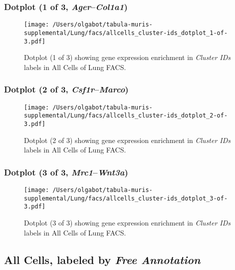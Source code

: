 \clearpage

\subsubsection{Dotplot (1 of 3, \emph{Ager}--\emph{Col1a1})}
\begin{figure}[h]
\centering
\texttt{[image: /Users/olgabot/tabula-muris-supplemental/Lung/facs/allcells\_cluster-ids\_dotplot\_1-of-3.pdf]}

\caption{ Dotplot (1 of 3)  showing gene expression enrichment in \emph{Cluster IDs} labels in All Cells of Lung FACS. }
\end{figure}


\clearpage

\subsubsection{Dotplot (2 of 3, \emph{Csf1r}--\emph{Marco})}
\begin{figure}[h]
\centering
\texttt{[image: /Users/olgabot/tabula-muris-supplemental/Lung/facs/allcells\_cluster-ids\_dotplot\_2-of-3.pdf]}

\caption{ Dotplot (2 of 3)  showing gene expression enrichment in \emph{Cluster IDs} labels in All Cells of Lung FACS. }
\end{figure}


\clearpage

\subsubsection{Dotplot (3 of 3, \emph{Mrc1}--\emph{Wnt3a})}
\begin{figure}[h]
\centering
\texttt{[image: /Users/olgabot/tabula-muris-supplemental/Lung/facs/allcells\_cluster-ids\_dotplot\_3-of-3.pdf]}

\caption{ Dotplot (3 of 3)  showing gene expression enrichment in \emph{Cluster IDs} labels in All Cells of Lung FACS. }
\end{figure}


\clearpage

\subsection{All Cells, labeled by \emph{Free Annotation}}
